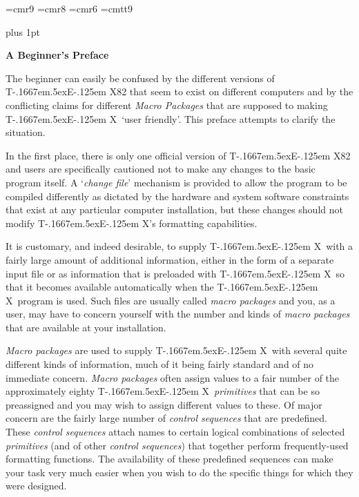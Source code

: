 
\font\ninerm=cmr9  \font\eightrm=cmr8  \font\sixrm=cmr6 %
\font\ttt=cmtt9

\def\TeX{T\kern-.1667em\lower.5ex\hbox{E}\kern-.125em X}
\def\TEX{T\kern-.1667em\lower.5ex\hbox{E}\kern-.125em X}
\def\La{L\kern-.1667em\raise.5ex\hbox{a}\kern-.1em}


\def\undertext#1{$\underline{\hbox{#1}}$}
\def\\{{\tt \char'134}}
\def\up{{\sy \char'42}}
\def\down{{\sy \char'43}}
\def\caret{{\char'17}}
\parskip 10pt plus 1pt
\parindent 0pt

\def\cs{{\sl control sequence}} 
\def\css{{\sl control sequences}} 
\def\Css{{\sl Control sequences}}
\def\lbr{{\tt \char'173}}  \def\rbr{{\tt \char'175}}  \def\rrbr{{\tt \char'175\char'175}}
\def\und{\tt \char'137}
\def\til{\tt \char'176}
\def\sup{\tt \char'136}
\null\vfill
\centerline {\bf A Beginner's Preface}

\vfill
The beginner can easily be confused by the different
versions of \TeX82 that seem to exist on different computers
and by the conflicting claims for different {\sl Macro Packages\/}
that are supposed to making \TeX\ `user friendly'.
This preface attempts to clarify the situation.

In the first place, there is only one official version of \TeX82 and users
are specifically cautioned not to make any changes to the basic program
itself.  A `{\sl change file\/}' mechanism is provided to allow
the program to be compiled differently as dictated by the hardware and
system software constraints that exist at any particular computer
installation, but these changes should not modify \TeX's formatting 
capabilities.

It is customary, and indeed desirable, to supply \TeX\ with a fairly large
amount of additional information, either in the form of a separate
input file or as information that is preloaded with \TeX\ so that
it becomes available automatically when the \TeX\ program is used.  Such
files are usually called {\sl macro packages\/} and you, as a user, may
have to concern yourself with the number and kinds of {\sl macro
packages\/} that are available at your installation.

{\sl Macro packages\/} are used to supply \TeX\ with  several quite different
kinds of information, much of it being fairly standard and of no immediate concern.
{\sl Macro packages\/} often assign values to a fair number of the approximately
eighty \TeX\ {\sl primitives\/} that can be so preassigned and you may wish
to assign different values to these.
Of major concern are the fairly large number of {\sl
control sequences\/} that are predefined.  These {\sl control
sequences\/} attach names to certain logical combinations of selected {\sl
primitives\/} (and of other {\sl control sequences\/}) that together perform
frequently-used formatting functions. The availability of these predefined sequences
can make your task very much easier when you wish to do the
specific things for which they were designed.

